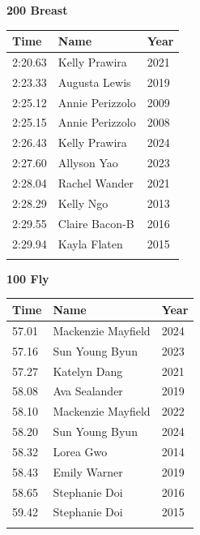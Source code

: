 \vspace{1.2em}
\noindent\begin{minipage}[t]{0.48\textwidth}
\centering
\textbf{\textcolor{teamprimary}{200 Breast}}\par
\vspace{0.5em}
\centering
\small
\renewcommand{\arraystretch}{1.0}
\setlength{\tabcolsep}{4pt}
\begin{tabular}{@{}p{1.8cm}p{3.0cm}p{1.0cm}@{}}
\toprule
\textbf{Time} & \textbf{Name} & \textbf{Year} \\
\midrule
2:20.63 & Kelly Prawira & 2021 \\
2:23.33 & Augusta Lewis & 2019 \\
2:25.12 & Annie Perizzolo & 2009 \\
2:25.15 & Annie Perizzolo & 2008 \\
2:26.43 & Kelly Prawira & 2024 \\
2:27.60 & Allyson Yao & 2023 \\
2:28.04 & Rachel Wander & 2021 \\
2:28.29 & Kelly Ngo & 2013 \\
2:29.55 & Claire Bacon-B & 2016 \\
2:29.94 & Kayla Flaten & 2015 \\
\bottomrule
\vspace{0.5em}
\end{tabular}
\end{minipage}
\hfill
\begin{minipage}[t]{0.48\textwidth}
\centering
\textbf{\textcolor{teamprimary}{100 Fly}}\par
\vspace{0.5em}
\centering
\small
\renewcommand{\arraystretch}{1.0}
\setlength{\tabcolsep}{4pt}
\begin{tabular}{@{}p{1.8cm}p{3.0cm}p{1.0cm}@{}}
\toprule
\textbf{Time} & \textbf{Name} & \textbf{Year} \\
\midrule
57.01 & Mackenzie Mayfield & 2024 \\
57.16 & Sun Young Byun & 2023 \\
57.27 & Katelyn Dang & 2021 \\
58.08 & Ava Sealander & 2019 \\
58.10 & Mackenzie Mayfield & 2022 \\
58.20 & Sun Young Byun & 2024 \\
58.32 & Lorea Gwo & 2014 \\
58.43 & Emily Warner & 2019 \\
58.65 & Stephanie Doi & 2016 \\
59.42 & Stephanie Doi & 2015 \\
\bottomrule
\vspace{0.5em}
\end{tabular}
\end{minipage}
